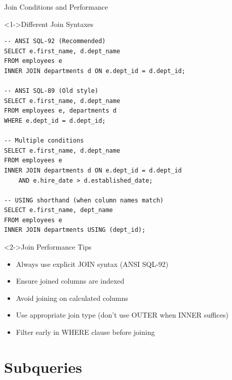 \documentclass[aspectratio=169,11pt]{beamer}
\begin{document}
\begin{frame}[fragile]{Join Conditions and Performance}
\begin{exampleblock}<1->{Different Join Syntaxes}
\begin{lstlisting}
-- ANSI SQL-92 (Recommended)
SELECT e.first_name, d.dept_name
FROM employees e
INNER JOIN departments d ON e.dept_id = d.dept_id;

-- ANSI SQL-89 (Old style)
SELECT e.first_name, d.dept_name
FROM employees e, departments d
WHERE e.dept_id = d.dept_id;

-- Multiple conditions
SELECT e.first_name, d.dept_name
FROM employees e
INNER JOIN departments d ON e.dept_id = d.dept_id
    AND e.hire_date > d.established_date;

-- USING shorthand (when column names match)
SELECT e.first_name, dept_name
FROM employees e
INNER JOIN departments USING (dept_id);
\end{lstlisting}
\end{exampleblock}

\pause
\begin{alertblock}<2->{Join Performance Tips}
\begin{itemize}
    \item Always use explicit JOIN syntax (ANSI SQL-92)
    \item Ensure joined columns are indexed
    \item Avoid joining on calculated columns
    \item Use appropriate join type (don't use OUTER when INNER suffices)
    \item Filter early in WHERE clause before joining
\end{itemize}
\end{alertblock}
\end{frame}

\section{Subqueries}
\end{document}
